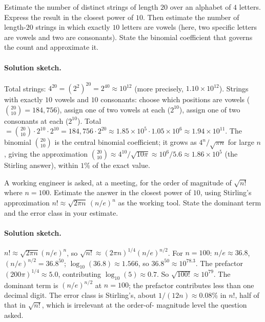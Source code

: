 \begin{exercise}
Estimate the number of distinct strings of length $20$ over an
alphabet of $4$ letters. Express the result in the closest power of
$10$. Then estimate the number of length-$20$ strings in which
exactly $10$ letters are vowels (here, two specific letters are
vowels and two are consonants). State the binomial coefficient that
governs the count and approximate it.

\paragraph{Solution sketch.}
Total strings: $4^{20} = (2^{2})^{20} = 2^{40} \approx 10^{12}$
(more precisely, $1.10 \times 10^{12}$). Strings with exactly $10$
vowels and $10$ consonants: choose which positions are vowels
($\binom{20}{10} = 184{,}756$), assign one of two vowels at each
($2^{10}$), assign one of two consonants at each ($2^{10}$). Total
$= \binom{20}{10} \cdot 2^{10} \cdot 2^{10} = 184{,}756 \cdot 2^{20}
\approx 1.85 \times 10^{5} \cdot 1.05 \times 10^{6} \approx 1.94
\times 10^{11}$. The binomial $\binom{20}{10}$ is the central
binomial coefficient; it grows as $4^{n}/\sqrt{\pi n}$ for large
$n$, giving the approximation $\binom{20}{10} \approx 4^{10}/
\sqrt{10 \pi} \approx 10^{6}/5.6 \approx 1.86 \times 10^{5}$ (the
Stirling answer), within $1 \%$ of the exact value.
\end{exercise}

\begin{exercise}
A working engineer is asked, at a meeting, for the order of magnitude
of $\sqrt{n!}$ where $n = 100$. Estimate the answer in the closest
power of $10$, using Stirling's approximation $n! \approx \sqrt{2\pi
n}\,(n/e)^{n}$ as the working tool. State the dominant term and the
error class in your estimate.

\paragraph{Solution sketch.}
$n! \approx \sqrt{2 \pi n}(n/e)^{n}$, so $\sqrt{n!} \approx (2 \pi
n)^{1/4} (n/e)^{n/2}$. For $n = 100$: $n/e \approx 36.8$,
$(n/e)^{n/2} = 36.8^{50}$; $\log_{10}(36.8) \approx 1.566$, so
$36.8^{50} \approx 10^{78.3}$. The prefactor $(200 \pi)^{1/4}
\approx 5.0$, contributing $\log_{10}(5) \approx 0.7$. So $\sqrt{100!}
\approx 10^{79}$. The dominant term is $(n/e)^{n/2}$ at $n = 100$;
the prefactor contributes less than one decimal digit. The error
class is Stirling's, about $1/(12 n) \approx 0.08 \%$ in $n!$,
half of that in $\sqrt{n!}$, which is irrelevant at the order-of-
magnitude level the question asked.
\end{exercise}

